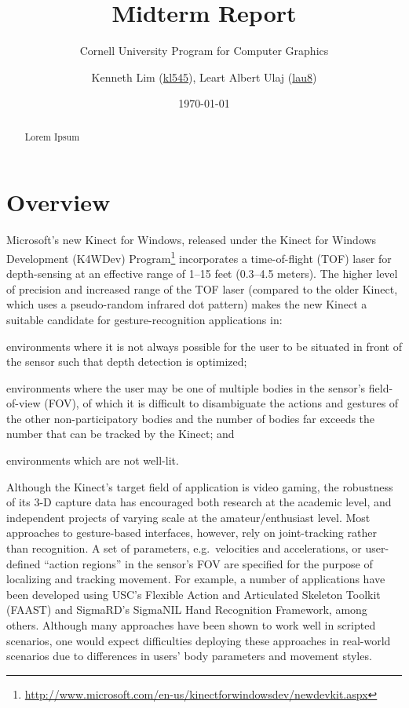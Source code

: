 \documentclass{scrartcl}
\title{Midterm Report}
\subtitle{Cornell University Program for Computer Graphics}
\author{Kenneth Lim (\href{mailto:kl545@cornell.edu}{kl545}), Leart Albert Ulaj (\href{mailto:lau8@cornell.edu}{lau8})}
\date{\today}
\begin{document}
  \maketitle
  \begin{abstract}
    Lorem Ipsum
  \end{abstract}
  \tableofcontents
  \newpage
  \section{Overview}
    Microsoft's new Kinect for Windows, released under the Kinect for Windows Development (K4WDev) Program\footnote{\url{http://www.microsoft.com/en-us/kinectforwindowsdev/newdevkit.aspx}} incorporates a time-of-flight (TOF) laser for depth-sensing at an effective range of 1--15 feet (0.3--4.5 meters). The higher level of precision and increased range of the TOF laser (compared to the older Kinect, which uses a pseudo-random infrared dot pattern) makes the new Kinect a suitable candidate for gesture-recognition applications in:\begin{inparaenum}[(1)]
      \item environments where it is not always possible for the user to be situated in front of the sensor such that depth detection is optimized;
      \item environments where the user may be one of multiple bodies in the sensor's field-of-view (FOV), of which it is difficult to disambiguate the actions and gestures of the other non-participatory bodies and the number of bodies far exceeds the number that can be tracked by the Kinect; and
      \item environments which are not well-lit.
    \end{inparaenum}

    Although the Kinect's target field of application is video gaming, the robustness of its 3-D capture data has encouraged both research at the academic level, and independent projects of varying scale at the amateur/enthusiast level. Most approaches to gesture-based interfaces, however, rely on joint-tracking rather than recognition. A set of parameters, e.g.~velocities and accelerations, or user-defined ``action regions'' in the sensor's FOV are specified for the purpose of localizing and tracking movement. For example, a number of applications have been developed using USC's Flexible Action and Articulated Skeleton Toolkit (FAAST) and SigmaRD's SigmaNIL Hand Recognition Framework, among others. Although many approaches have been shown to work well in scripted scenarios, one would expect difficulties deploying these approaches in real-world scenarios due to differences in users' body parameters and movement styles.
\end{document}
